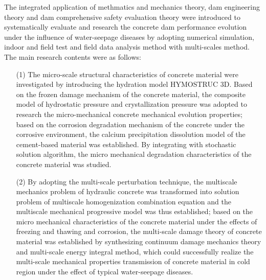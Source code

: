 \begin{enabstract}
The integrated application of methmatics and mechanics theory, dam engineering theory and dam comprehensive safety evaluation theory were introduced to systematically evaluate and research the concrete dam performance evolution under the influence of water-seepage diseases by adopting numerical simulation, indoor and field test and field data analysis method with multi-scales method. The main research contents were as follows:

\begin{enumerate}
\item[(1)] The micro-scale structural characteristics of concrete material were investigated by introducing the hydration model HYMOSTRUC 3D. Based on the frozen damage mechanism of the concrete material, the composite model of hydrostatic pressure and crystallization pressure was adopted to research the micro-mechanical concrete mechanical evolution properties; based on the corrosion degradation mechanism of the concrete under the corrosive environment, the calcium precipitation dissolution model of the cement-based material was established. By integrating with stochastic solution algorithm, the micro mechanical degradation characteristics of the concrete material was studied.
\item[(2)] By adopting the multi-scale perturbation technique, the multiscale mechanics problem of hydraulic concrete was transformed into solution problem of multiscale homogenization combination equation and the multiscale mechanical progressive model was thus established; based on the micro mechanical characteristics of the concrete material under the effects of freezing and thawing and corrosion, the multi-scale damage theory of concrete material was established by synthesizing continuum damage mechanics theory and multi-scale energy integral method, which could successfully realize the multi-scale mechanical properties transmission of concrete material in cold region under the effect of typical water-seepage diseases.
\end{enumerate}  
 

\end{enabstract}
